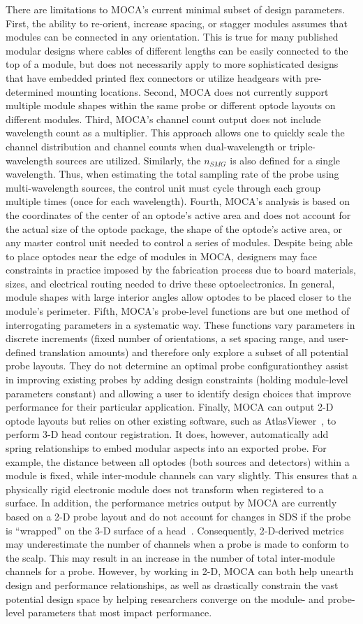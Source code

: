There are limitations to \ac{MOCA}'s current minimal subset of design parameters. First, the ability to re-orient, increase spacing, or stagger modules assumes that modules can be connected in any orientation. This is true for many published modular designs where cables of different lengths can be easily connected to the top of a module, but does not necessarily apply to more sophisticated designs that have embedded printed flex connectors or utilize headgears with pre-determined mounting locations. Second, \ac{MOCA} does not currently support multiple module shapes within the same probe or different optode layouts on different modules. Third, \ac{MOCA}'s channel count output does not include wavelength count as a multiplier. This approach allows one to quickly scale the channel distribution and channel counts when dual-wavelength or triple-wavelength sources are utilized. Similarly, the $n_{SMG}$ is also defined for a single wavelength. Thus, when estimating the total sampling rate of the probe using multi-wavelength sources, the control unit must cycle through each group multiple times (once for each wavelength). Fourth, \ac{MOCA}'s analysis is based on the coordinates of the center of an optode's active area and does not account for the actual size of the optode package, the shape of the optode's active area, or any master control unit needed to control a series of modules. Despite being able to place optodes near the edge of modules in \ac{MOCA}, designers may face constraints in practice imposed by the fabrication process due to board materials, sizes, and electrical routing needed to drive these optoelectronics. In general, module shapes with large interior angles allow optodes to be placed closer to the module's perimeter. Fifth, \ac{MOCA}'s probe-level functions are but one method of interrogating parameters in a systematic way. These functions vary parameters in discrete increments (fixed number of orientations, a set spacing range, and user-defined translation amounts) and therefore only explore a subset of all potential probe layouts. They do not determine an optimal probe configuration\textemdash they assist in improving existing probes by adding design constraints (holding module-level parameters constant) and allowing a user to identify design choices that improve performance for their particular application.  Finally, \ac{MOCA} can output 2-D optode layouts but relies on other existing software, such as AtlasViewer~\cite{Aasted2015}, to perform 3-D head contour registration. It does, however, automatically add spring relationships to embed modular aspects into an exported probe. For example, the distance between all optodes (both sources and detectors) within a module is fixed, while inter-module channels can vary slightly. This ensures that a physically rigid electronic module does not transform when registered to a surface. In addition, the performance metrics output by \ac{MOCA} are currently based on a 2-D probe layout and do not account for changes in \ac{SDS} if the probe is ``wrapped'' on the 3-D surface of a head~\cite{Zhao2021}. Consequently, 2-D-derived metrics may underestimate the number of channels when a probe is made to conform to the scalp. This may result in an increase in the number of total inter-module channels for a probe. However, by working in 2-D, \ac{MOCA} can both help unearth design and performance relationships, as well as drastically constrain the vast potential design space by helping researchers converge on the module- and probe-level parameters that most impact performance.